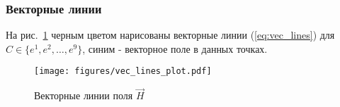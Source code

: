 \begin{frame}\frametitle{Векторные линии}
	На рис.~\ref{fig:vec_lines} черным цветом нарисованы векторные линии (\ref{eq:vec_lines})
	для $C \in \{e^1, e^2, \ldots, e^9\}$, синим - векторное поле в данных точках.
	\begin{figure}
		\centering
		\texttt{[image: figures/vec\_lines\_plot.pdf]}
		\caption{Векторные линии поля \(\vec H\)}\label{fig:vec_lines}
	\end{figure}

\end{frame}
